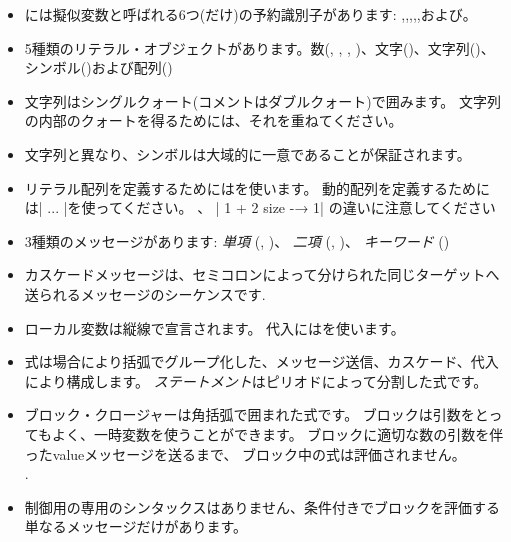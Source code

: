 \documentclass[a4paper,10pt,twoside]{book}
\begin{document}
\begin{itemize}

\item	\pharo には擬似変数と呼ばれる6つ(だけ)の予約識別子があります: ,,,,,および。

\item	5種類のリテラル・オブジェクトがあります。数(, , , )、文字()、文字列()、シンボル()および配列()

\item	文字列はシングルクォート(コメントはダブルクォート)で囲みます。
		文字列の内部のクォートを得るためには、それを重ねてください。

\item	文字列と異なり、シンボルは大域的に一意であることが保証されます。

\item	リテラル配列を定義するためにはを使います。
		動的配列を定義するためには\ct|{ ... }|を使ってください。
		、
		\ct|{ 1 + 2 } size -→ 1|
		の違いに注意してください

\item	3種類のメッセージがあります:
		\emph{単項} (\eg {}, )、
		\emph{二項} (\eg {}, )、
		\emph{キーワード} (\eg {})

\item	カスケードメッセージは、セミコロンによって分けられた同じターゲットへ送られるメッセージのシーケンスです.

\item	ローカル変数は縦線で宣言されます。
		代入には\ct{:=}を使います。

\item	式は場合により括弧でグループ化した、メッセージ送信、カスケード、代入により構成します。
		\emph{ステートメント}はピリオドによって分割した式です。

\item	ブロック・クロージャーは角括弧で囲まれた式です。
		ブロックは引数をとってもよく、一時変数を使うことができます。
		ブロックに適切な数の引数を伴ったvalueメッセージを送るまで、
		ブロック中の式は評価されません。\\
		.

\item	制御用の専用のシンタックスはありません、条件付きでブロックを評価する単なるメッセージだけがあります。

\end{itemize}

\ifx\wholebook\relax\else
\end{document}
